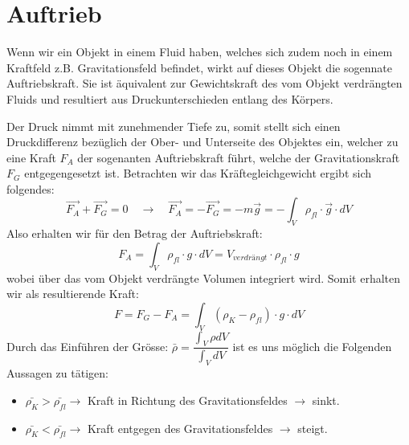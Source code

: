 \documentclass[12pt]{article}
\begin{document}
\section{Auftrieb}
Wenn wir ein Objekt in einem Fluid haben, welches sich zudem noch in einem Kraftfeld z.B. Gravitationsfeld befindet, wirkt auf dieses Objekt die sogennate Auftriebskraft. Sie ist äquivalent zur Gewichtskraft des vom Objekt verdrängten Fluids und resultiert aus Druckunterschieden entlang des Körpers.
 \begin{figure}[H]
  \label{fig:1teil}
\end{figure}
Der Druck nimmt mit zunehmender Tiefe zu, somit stellt sich einen Druckdifferenz bezüglich der Ober- und Unterseite des Objektes ein, welcher zu eine Kraft $F_A$ der sogenanten Auftriebskraft führt, welche der Gravitationskraft $F_G$ entgegengesetzt ist.
Betrachten wir das Kräftegleichgewicht ergibt sich folgendes:
\begin{equation}
\vec{F_A} + \vec{F_G} = 0 \quad \rightarrow \quad \vec{F_A} = -\vec{F_G} = -m\vec{g} = - \int_V \rho_{fl} \cdot \vec{g} \cdot dV
\end{equation}
Also erhalten wir für den Betrag der Auftriebskraft:
\begin{equation}
F_A = \int_V \rho_{fl} \cdot g \cdot dV = V_{verdrängt} \cdot \rho_{fl} \cdot g
\end{equation}
wobei über das vom Objekt verdrängte Volumen integriert wird.
Somit erhalten wir als resultierende Kraft:
\begin{equation}
F = F_G - F_A = \int_V (\rho_{K} - \rho_{fl}) \cdot g \cdot dV
\end{equation}
Durch das Einführen der Grösse: $\bar{\rho} = \dfrac{\int_V \rho dV}{\int_V dV}$ ist es uns möglich die Folgenden Aussagen zu tätigen:
\begin{itemize}
\item $\bar{\rho_K} > \bar{\rho_{fl}} \rightarrow$ Kraft in Richtung des Gravitationsfeldes $\rightarrow$ sinkt.
\item $\bar{\rho_K} < \bar{\rho_{fl}} \rightarrow$ Kraft entgegen des Gravitationsfeldes $\rightarrow$ steigt.
\end{itemize}
\clearpage
\end{document}
